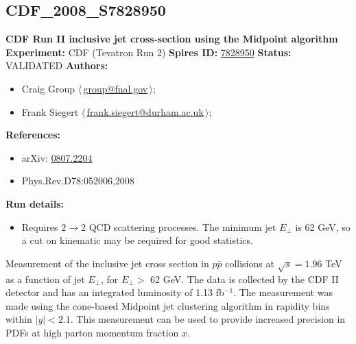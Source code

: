 \subsection[CDF\_2008\_S7828950]{CDF\_2008\_S7828950\,\cite{Aaltonen:2008eq}}
\textbf{CDF Run II inclusive jet cross-section using the Midpoint algorithm}\newline
\textbf{Experiment:} CDF (Tevatron Run 2) \newline
\textbf{Spires ID:} \href{http://www.slac.stanford.edu/spires/find/hep/www?rawcmd=key+7828950}{7828950}\newline
\textbf{Status:} VALIDATED\newline
\textbf{Authors:}
\begin{itemize}
  \item Craig Group $\langle\,$\href{mailto:group@fnal.gov}{group@fnal.gov}$\,\rangle$;
  \item Frank Siegert $\langle\,$\href{mailto:frank.siegert@durham.ac.uk}{frank.siegert@durham.ac.uk}$\,\rangle$;
\end{itemize}
\textbf{References:}
\begin{itemize}
  \item arXiv: \href{http://arxiv.org/abs/0807.2204}{0807.2204}
  \item Phys.Rev.D78:052006,2008
\end{itemize}
\textbf{Run details:}
\begin{itemize}

  \item Requires $2\rightarrow{2}$ QCD scattering processes. The minimum jet $E_\perp$ is 62 GeV, so a cut on kinematic \pTmin may be required for good statistics.\end{itemize}

\noindent Measurement of the inclusive jet cross section in $p\bar{p}$ collisions at $\sqrt{s}=1.96$ TeV as a function of jet $E_\perp$, for $E_\perp >$ 62 GeV. The data is collected by the CDF II detector and has an integrated luminosity of 1.13 fb$^{-1}$. The measurement was made using the cone-based Midpoint jet clustering algorithm in rapidity bins within $|y|<2.1$. This measurement can be used to provide increased precision in PDFs at high parton momentum fraction $x$.

\clearpage


\clearpage

